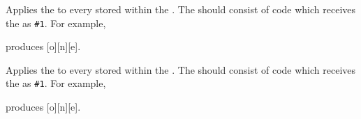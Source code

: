 \documentclass[oneside]{book}
\begin{document}
\begin{function}{\TlMapInline}
\begin{syntax}
  
\end{syntax}
Applies the  to every  stored within the
. The   should consist of code which
receives the  as \verb|#1|. For example,
\begin{codehigh}
\IgnoreSpacesOn
\TlClear \lTmpaTl
{} {
  \TlPutRight \lTmpaTl {[#1]}
}
\Return{\TlUse\lTmpaTl}
\IgnoreSpacesOff
\end{codehigh}
produces [o][n][e].
\end{function}

\begin{function}{\TlVarMapInline}
\begin{syntax}
  
\end{syntax}
Applies the  to every  stored within the
. The  should consist of code which
receives the  as \verb|#1|. For example,
\begin{codehigh}
\IgnoreSpacesOn
\TlClear \lTmpaTl
\TlSet {}
\TlVarMapInline \lTmpkTl {
  \TlPutRight \lTmpaTl {[#1]}
}
\Return{\TlUse\lTmpaTl}
\IgnoreSpacesOff
\end{codehigh}
produces [o][n][e].
\end{function}

\end{document}
